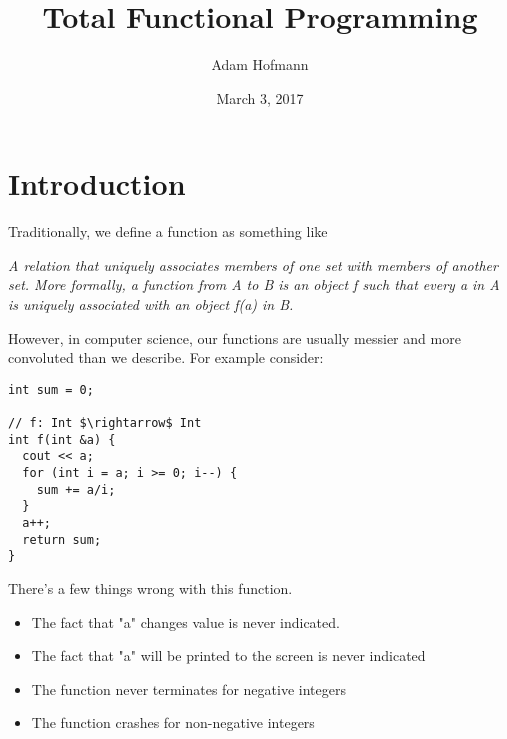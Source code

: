 \documentclass[12pt]{article}
\title{Total Functional Programming}
\author{Adam Hofmann}
\date{March 3, 2017}
\begin{document}
\begin{titlepage} 

\maketitle
\end{titlepage}

\section{Introduction}
Traditionally, we define a function as something like

\emph{A relation that uniquely associates members of one set with members of another set. More formally, a function from A to B is an object f such that every a in A is uniquely associated with an object f(a) in B.} \cite{wolfram}

However, in computer science, our functions are usually messier and more convoluted than we describe. For example consider:
\bigskip
\begin{lstlisting}[frame=single,mathescape=true]
int sum = 0;

// f: Int $\rightarrow$ Int
int f(int &a) {
  cout << a;
  for (int i = a; i >= 0; i--) {
    sum += a/i;
  }
  a++;
  return sum;
}
\end{lstlisting}

There's a few things wrong with this function.
\begin{itemize}
\item The fact that "a" changes value is never indicated.
\item The fact that "a" will be printed to the screen is never indicated
\item The function never terminates for negative integers
\item The function crashes for non-negative integers
\end{itemize}
\end{document}
